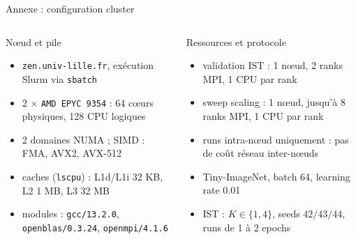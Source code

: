 \documentclass[aspectratio=169]{beamer}
\begin{document}
\begin{frame}{Annexe : configuration cluster}
\footnotesize
\begin{columns}[T,onlytextwidth]
\begin{block}{Nœud et pile}
\begin{itemize}
  \item \texttt{zen.univ-lille.fr}, exécution Slurm via \texttt{sbatch}
  \item 2 \(\times\) \texttt{AMD EPYC 9354} : 64 cœurs physiques, 128 CPU logiques
  \item 2 domaines NUMA ; SIMD : FMA, AVX2, AVX-512
  \item caches (\texttt{lscpu}) : L1d/L1i 32 KB, L2 1 MB, L3 32 MB
  \item modules : \texttt{gcc/13.2.0}, \texttt{openblas/0.3.24}, \texttt{openmpi/4.1.6}
\end{itemize}
\end{block}

\begin{block}{Ressources et protocole}
\begin{itemize}
  \item validation IST : 1 nœud, 2 ranks MPI, 1 CPU par rank
  \item sweep scaling : 1 nœud, jusqu'à 8 ranks MPI, 1 CPU par rank
  \item runs intra-nœud uniquement : pas de coût réseau inter-nœuds
  \item Tiny-ImageNet, batch 64, learning rate 0.01
  \item IST : \(K \in \{1,4\}\), seeds \(42/43/44\), runs de 1 à 2 epochs
\end{itemize}
\end{block}
\end{columns}
\end{frame}
\end{document}
